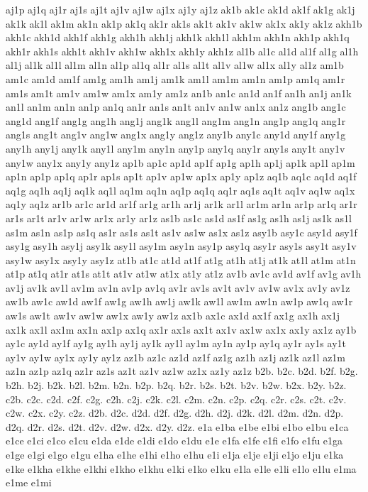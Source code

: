 {aj1p
aj1q
aj1r
aj1s
aj1t
aj1v
aj1w
aj1x
aj1y
aj1z
ak1b
ak1c
ak1d
ak1f
ak1g
ak1j
ak1k
ak1l
ak1m
ak1n
ak1p
ak1q
ak1r
ak1s
ak1t
ak1v
ak1w
ak1x
ak1y
ak1z
akh1b
akh1c
akh1d
akh1f
akh1g
akh1h
akh1j
akh1k
akh1l
akh1m
akh1n
akh1p
akh1q
akh1r
akh1s
akh1t
akh1v
akh1w
akh1x
akh1y
akh1z
al1b
al1c
al1d
al1f
al1g
al1h
al1j
al1k
al1l
al1m
al1n
al1p
al1q
al1r
al1s
al1t
al1v
al1w
al1x
al1y
al1z
am1b
am1c
am1d
am1f
am1g
am1h
am1j
am1k
am1l
am1m
am1n
am1p
am1q
am1r
am1s
am1t
am1v
am1w
am1x
am1y
am1z
an1b
an1c
an1d
an1f
an1h
an1j
an1k
an1l
an1m
an1n
an1p
an1q
an1r
an1s
an1t
an1v
an1w
an1x
an1z
ang1b
ang1c
ang1d
ang1f
ang1g
ang1h
ang1j
ang1k
ang1l
ang1m
ang1n
ang1p
ang1q
ang1r
ang1s
ang1t
ang1v
ang1w
ang1x
ang1y
ang1z
any1b
any1c
any1d
any1f
any1g
any1h
any1j
any1k
any1l
any1m
any1n
any1p
any1q
any1r
any1s
any1t
any1v
any1w
any1x
any1y
any1z
ap1b
ap1c
ap1d
ap1f
ap1g
ap1h
ap1j
ap1k
ap1l
ap1m
ap1n
ap1p
ap1q
ap1r
ap1s
ap1t
ap1v
ap1w
ap1x
ap1y
ap1z
aq1b
aq1c
aq1d
aq1f
aq1g
aq1h
aq1j
aq1k
aq1l
aq1m
aq1n
aq1p
aq1q
aq1r
aq1s
aq1t
aq1v
aq1w
aq1x
aq1y
aq1z
ar1b
ar1c
ar1d
ar1f
ar1g
ar1h
ar1j
ar1k
ar1l
ar1m
ar1n
ar1p
ar1q
ar1r
ar1s
ar1t
ar1v
ar1w
ar1x
ar1y
ar1z
as1b
as1c
as1d
as1f
as1g
as1h
as1j
as1k
as1l
as1m
as1n
as1p
as1q
as1r
as1s
as1t
as1v
as1w
as1x
as1z
asy1b
asy1c
asy1d
asy1f
asy1g
asy1h
asy1j
asy1k
asy1l
asy1m
asy1n
asy1p
asy1q
asy1r
asy1s
asy1t
asy1v
asy1w
asy1x
asy1y
asy1z
at1b
at1c
at1d
at1f
at1g
at1h
at1j
at1k
at1l
at1m
at1n
at1p
at1q
at1r
at1s
at1t
at1v
at1w
at1x
at1y
at1z
av1b
av1c
av1d
av1f
av1g
av1h
av1j
av1k
av1l
av1m
av1n
av1p
av1q
av1r
av1s
av1t
av1v
av1w
av1x
av1y
av1z
aw1b
aw1c
aw1d
aw1f
aw1g
aw1h
aw1j
aw1k
aw1l
aw1m
aw1n
aw1p
aw1q
aw1r
aw1s
aw1t
aw1v
aw1w
aw1x
aw1y
aw1z
ax1b
ax1c
ax1d
ax1f
ax1g
ax1h
ax1j
ax1k
ax1l
ax1m
ax1n
ax1p
ax1q
ax1r
ax1s
ax1t
ax1v
ax1w
ax1x
ax1y
ax1z
ay1b
ay1c
ay1d
ay1f
ay1g
ay1h
ay1j
ay1k
ay1l
ay1m
ay1n
ay1p
ay1q
ay1r
ay1s
ay1t
ay1v
ay1w
ay1x
ay1y
ay1z
az1b
az1c
az1d
az1f
az1g
az1h
az1j
az1k
az1l
az1m
az1n
az1p
az1q
az1r
az1s
az1t
az1v
az1w
az1x
az1y
az1z
b2b.
b2c.
b2d.
b2f.
b2g.
b2h.
b2j.
b2k.
b2l.
b2m.
b2n.
b2p.
b2q.
b2r.
b2s.
b2t.
b2v.
b2w.
b2x.
b2y.
b2z.
c2b.
c2c.
c2d.
c2f.
c2g.
c2h.
c2j.
c2k.
c2l.
c2m.
c2n.
c2p.
c2q.
c2r.
c2s.
c2t.
c2v.
c2w.
c2x.
c2y.
c2z.
d2b.
d2c.
d2d.
d2f.
d2g.
d2h.
d2j.
d2k.
d2l.
d2m.
d2n.
d2p.
d2q.
d2r.
d2s.
d2t.
d2v.
d2w.
d2x.
d2y.
d2z.
e1a
e1ba
e1be
e1bi
e1bo
e1bu
e1ca
e1ce
e1ci
e1co
e1cu
e1da
e1de
e1di
e1do
e1du
e1e
e1fa
e1fe
e1fi
e1fo
e1fu
e1ga
e1ge
e1gi
e1go
e1gu
e1ha
e1he
e1hi
e1ho
e1hu
e1i
e1ja
e1je
e1ji
e1jo
e1ju
e1ka
e1ke
e1kha
e1khe
e1khi
e1kho
e1khu
e1ki
e1ko
e1ku
e1la
e1le
e1li
e1lo
e1lu
e1ma
e1me
e1mi
}
